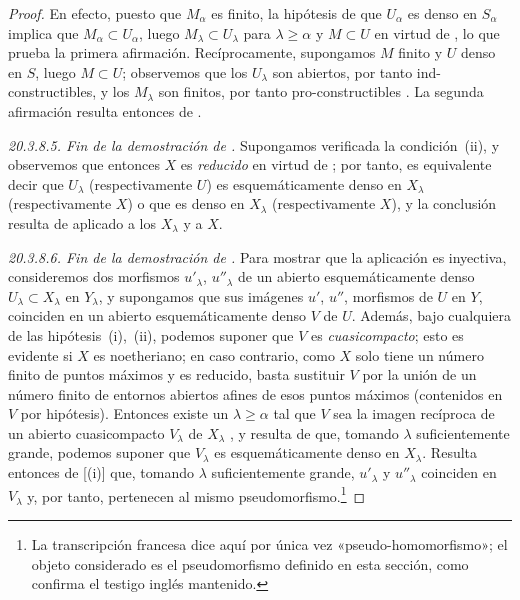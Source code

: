 \begin{proof}
En efecto, puesto que $M_\alpha$ es finito, la hipótesis de que $U_\alpha$ es denso en $S_\alpha$ implica que
 $M_\alpha\subset U_\alpha$, luego $M_\lambda\subset U_\lambda$ para $\lambda\geq\alpha$ y $M\subset U$ en virtud de , lo que prueba la primera afirmación.
Recíprocamente, supongamos $M$ finito y $U$ denso en $S$, luego $M\subset U$; observemos que los $U_\lambda$ son abiertos, por tanto ind-constructibles, y los $M_\lambda$ son finitos, por tanto pro-constructibles .
La segunda afirmación resulta entonces de .

\label{IV.20.3.8.5}
\emph{20.3.8.5. Fin de la demostración de .}
Supongamos verificada la condición~(ii), y observemos que entonces $X$ es \emph{reducido} en virtud de ; por tanto, es equivalente decir que $U_\lambda$ (respectivamente $U$) es esquemáticamente denso en $X_\lambda$ (respectivamente $X$) o que es denso en $X_\lambda$ (respectivamente $X$), y la conclusión resulta de  aplicado a los $X_\lambda$ y a $X$.

\label{IV.20.3.8.6}
\emph{20.3.8.6. Fin de la demostración de .}
Para mostrar que la aplicación  es inyectiva, consideremos dos morfismos $u'_\lambda$, $u''_\lambda$ de un abierto esquemáticamente denso $U_\lambda\subset X_\lambda$ en $Y_\lambda$, y supongamos que sus imágenes $u'$, $u''$, morfismos de $U$ en $Y$, coinciden en un abierto esquemáticamente denso $V$ de $U$.
Además, bajo cualquiera de las hipótesis~(i),~(ii), podemos suponer que $V$ es \emph{cuasicompacto}; esto es evidente si $X$ es noetheriano; en caso contrario, como $X$ solo tiene un número finito de puntos máximos y es reducido, basta sustituir $V$ por la unión de un número finito de entornos abiertos afines de esos puntos máximos (contenidos en $V$ por hipótesis).
Entonces existe un $\lambda\geq\alpha$ tal que $V$ sea la imagen recíproca de un abierto cuasicompacto $V_\lambda$ de $X_\lambda$ , y resulta de  que, tomando $\lambda$ suficientemente grande, podemos suponer que $V_\lambda$ es esquemáticamente denso en $X_\lambda$.
Resulta entonces de [(i)] que, tomando $\lambda$ suficientemente grande, $u'_\lambda$ y $u''_\lambda$ coinciden en $V_\lambda$ y, por tanto, pertenecen al mismo pseudomorfismo.\footnote{La transcripción francesa dice aquí por única vez «pseudo-homomorfismo»; el objeto considerado es el pseudomorfismo definido en esta sección, como confirma el testigo inglés mantenido.}


\end{proof}
